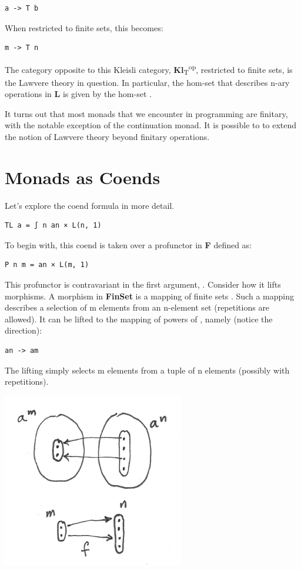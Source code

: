 \begin{verbatim}
a -> T b
\end{verbatim}

When restricted to finite sets, this becomes:

\begin{verbatim}
m -> T n
\end{verbatim}

The category opposite to this Kleisli category,
\textbf{Kl}\textsubscript{T}\textsuperscript{op}, restricted to finite
sets, is the Lawvere theory in question. In particular, the hom-set
 that describes n-ary operations in \textbf{L} is given
by the hom-set .

It turns out that most monads that we encounter in programming are
finitary, with the notable exception of the continuation monad. It is
possible to to extend the notion of Lawvere theory beyond finitary
operations.

\section{Monads as Coends}\label{monads-as-coends}

Let's explore the coend formula in more detail.

\begin{verbatim}
TL a = ∫ n an × L(n, 1)
\end{verbatim}

To begin with, this coend is taken over a profunctor  in
\textbf{F} defined as:

\begin{verbatim}
P n m = an × L(m, 1)
\end{verbatim}

This profunctor is contravariant in the first argument, .
Consider how it lifts morphisms. A morphism in \textbf{FinSet} is a
mapping of finite sets . Such a
mapping describes a selection of m elements from an n-element set
(repetitions are allowed). It can be lifted to the mapping of powers of
, namely (notice the direction):

\begin{verbatim}
an -> am
\end{verbatim}

The lifting simply selects m elements from a tuple of n elements
 (possibly with repetitions).

\includegraphics[width=3.12500in]{images/liftpower.png}

